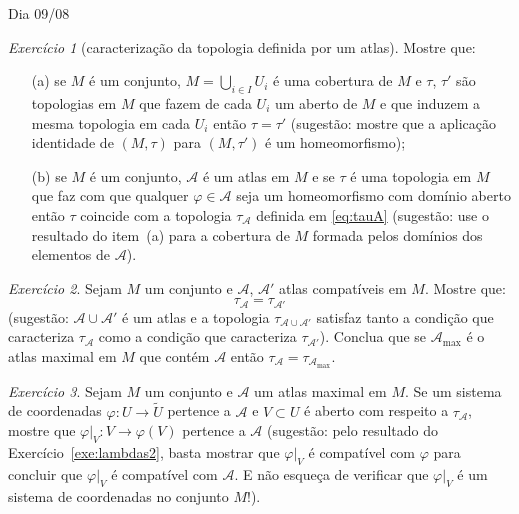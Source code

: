 \documentclass[oneside,11pt]{amsart}
\theoremstyle{remark}\newtheorem{exercise}{Exercício}[section]
\theoremstyle{plain}\newtheorem{teo}{Teorema}[section]
\theoremstyle{plain}\newtheorem{lem}[teo]{Lema}
\theoremstyle{plain}\newtheorem{prop}[teo]{Proposição}
\theoremstyle{definition}\newtheorem{defin}[teo]{Definição}
\theoremstyle{remark}\newtheorem{rem}[teo]{Observação}
\theoremstyle{definition}\newtheorem{example}[teo]{Exemplo}
\numberwithin{equation}{section}
\begin{document}
\begin{section}{Dia 09/08}
\begin{exercise}[caracterização da topologia definida por um atlas]\label{exe:cartopol}
Mostre que:
\begin{itemize}
\item[(a)] se $M$ é um conjunto, $M=\bigcup_{i\in I}U_i$ é uma cobertura de $M$ e $\tau$, $\tau'$ são topologias em $M$ que fazem de cada $U_i$
um aberto de $M$ e que induzem a mesma topologia em cada $U_i$ então $\tau=\tau'$ (sugestão: mostre que a aplicação identidade de $(M,\tau)$
para $(M,\tau')$ é um homeomorfismo);
\item[(b)] se $M$ é um conjunto, $\mathcal A$ é um atlas em $M$ e se $\tau$ é uma topologia em $M$ que faz com que qualquer $\varphi\in\mathcal A$ seja um
homeomorfismo com domínio aberto então $\tau$ coincide com a topologia $\tau_{\mathcal A}$ definida em \eqref{eq:tauA} (sugestão: use o resultado do item~(a)
para a cobertura de $M$ formada pelos domínios dos elementos de $\mathcal A$).
\end{itemize}
\end{exercise}

\begin{exercise}
Sejam $M$ um conjunto e $\mathcal A$, $\mathcal A'$ atlas compatíveis em $M$. Mostre que:
\[\tau_{\mathcal A}=\tau_{\mathcal A'}\]
(sugestão: $\mathcal A\cup\mathcal A'$ é um atlas e a topologia $\tau_{\mathcal A\cup\mathcal A'}$ satisfaz tanto a condição que caracteriza
$\tau_{\mathcal A}$ como a condição que caracteriza $\tau_{\mathcal A'}$).
Conclua que se $\mathcal A_{\max}$ é o atlas maximal em $M$ que contém $\mathcal A$ então $\tau_{\mathcal A}=\tau_{\mathcal A_{\max}}$.
\end{exercise}

\begin{exercise}
Sejam $M$ um conjunto e $\mathcal A$ um atlas maximal em $M$. Se um sistema de coordenadas
$\varphi:U\to\widetilde U$ pertence a $\mathcal A$ e $V\subset U$ é aberto
com respeito a $\tau_{\mathcal A}$, mostre que $\varphi\vert_V:V\to\varphi(V)$ pertence a $\mathcal A$ (sugestão: pelo resultado do Exercício~\ref{exe:lambdas2},
basta mostrar que $\varphi\vert_V$ é compatível com $\varphi$ para concluir que $\varphi\vert_V$ é compatível com $\mathcal A$. E não esqueça
de verificar que $\varphi\vert_V$ é um sistema de coordenadas no conjunto $M$!).
\end{exercise}

\end{section}
\end{document}
